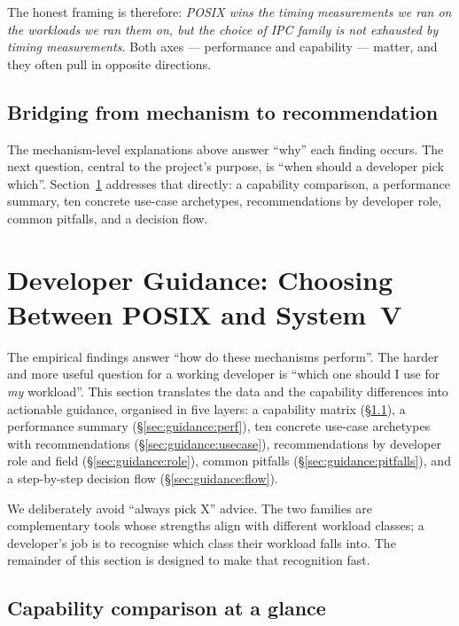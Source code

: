 \documentclass[a4paper,11pt]{article}
\begin{document}
The honest framing is therefore: \emph{POSIX wins the timing
measurements we ran on the workloads we ran them on, but the choice of
IPC family is not exhausted by timing measurements.} Both axes ---
performance and capability --- matter, and they often pull in opposite
directions.

\subsection{Bridging from mechanism to recommendation}
\label{sec:disc:bridge}

The mechanism-level explanations above answer ``why'' each finding
occurs. The next question, central to the project's purpose, is
``when should a developer pick which''. Section~\ref{sec:guidance}
addresses that directly: a capability comparison, a performance
summary, ten concrete use-case archetypes, recommendations by
developer role, common pitfalls, and a decision flow.

\section{Developer Guidance: Choosing Between POSIX and System~V}
\label{sec:guidance}

The empirical findings answer ``how do these mechanisms perform''.
The harder and more useful question for a working developer is
``which one should I use for \emph{my} workload''. This section
translates the data and the capability differences into actionable
guidance, organised in five layers: a capability matrix
(\S\ref{sec:guidance:cap}), a performance summary
(\S\ref{sec:guidance:perf}), ten concrete use-case archetypes with
recommendations (\S\ref{sec:guidance:usecase}), recommendations by
developer role and field (\S\ref{sec:guidance:role}), common
pitfalls (\S\ref{sec:guidance:pitfalls}), and a step-by-step
decision flow (\S\ref{sec:guidance:flow}).

We deliberately avoid ``always pick X'' advice. The two families
are complementary tools whose strengths align with different
workload classes; a developer's job is to recognise which class
their workload falls into. The remainder of this section is
designed to make that recognition fast.

\subsection{Capability comparison at a glance}
\label{sec:guidance:cap}
\end{document}
